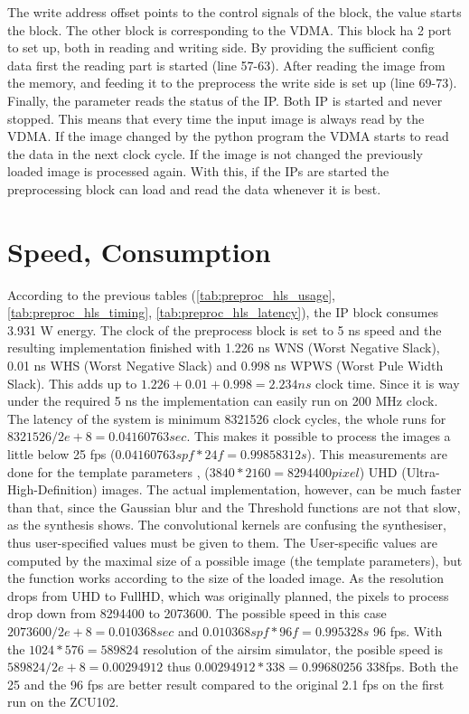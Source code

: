 The write address offset  points to the control signals of the block, the  value starts the block.
The other  block is corresponding to the VDMA.
This block ha 2 port to set up, both in reading and writing side.
By providing the sufficient config data first the reading part is started (line 57-63).
After reading the image from the memory, and feeding it to the preprocess the write side is set up (line 69-73).
Finally, the  parameter reads the status of the IP.
Both IP is started and never stopped.
This means that every time the input image is always read by the VDMA.
If the image changed by the python program the VDMA starts to read the data in the next clock cycle.
If the image is not changed the previously loaded image is processed again.
With this, if the IPs are started the preprocessing block can load and read the data whenever it is best.

\section{Speed, Consumption} %

According to the previous tables (\cref{tab:preproc_hls_usage}, \cref{tab:preproc_hls_timing}, \cref{tab:preproc_hls_latency}), the IP block consumes 3.931 W energy.
The clock of the preprocess block is set to 5 ns speed and the resulting implementation finished with 1.226 ns WNS (Worst Negative Slack), 0.01 ns WHS (Worst Negative Slack) and 0.998 ns WPWS (Worst Pule Width Slack).
This adds up to $1.226 + 0.01 + 0.998 = 2.234 ns$ clock time.
Since it is way under the required 5 ns the implementation can easily run on 200 MHz clock.
The latency of the system is minimum 8321526 clock cycles, the whole runs for $8321526 / 2e+8 = 0.04160763 sec$.
This makes it possible to process the images a little below 25 fps ($0.04160763 spf * 24 f = 0.99858312 s$).
This measurements are done for the template parameters ,  ($3840 * 2160 = 8294400 pixel$) UHD (Ultra-High-Definition) images.
The actual implementation, however, can be much faster than that, since the Gaussian blur and the Threshold functions are not that slow, as the synthesis shows.
The convolutional kernels are confusing the synthesiser, thus user-specified values must be given to them.
The User-specific values are computed by the maximal size of a possible image (the template parameters), but the function works according to the size of the loaded image.
As the resolution drops from UHD to FullHD, which was originally planned, the pixels to process drop down from 8294400 to 2073600.
The possible speed in this case $2073600 / 2e+8 = 0.010368 sec$ and $0.010368 spf * 96 f = 0.995328 s$ 96 fps.
With the $1024*576=589824$ resolution of the airsim simulator, the posible speed is $589824/ 2e+8 = 0.00294912$ thus  $0.00294912 * 338 = 0.99680256$ 338fps.
Both the 25 and the 96 fps are better result compared to the original 2.1 fps on the first run on the ZCU102.

\clearpage